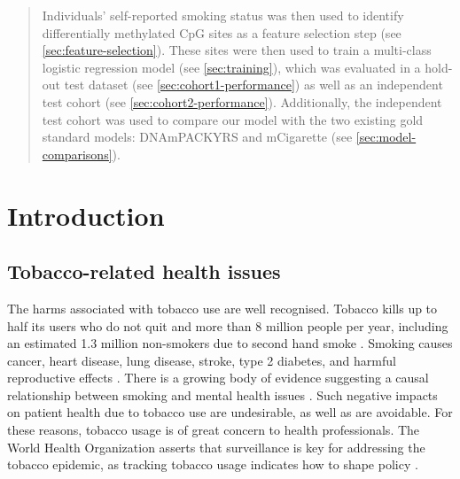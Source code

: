 \documentclass[draft]{article}
\begin{document}

\begin{abstract}
    Individuals' self-reported smoking status was then used to identify differentially methylated CpG sites as a feature selection step (see \ref{sec:feature-selection}). These sites were then used to train a multi-class logistic regression model (see \ref{sec:training}), which was evaluated in a hold-out test dataset (see \ref{sec:cohort1-performance}) as well as an independent test cohort (see \ref{sec:cohort2-performance}). Additionally, the independent test cohort was used to compare our model with the two existing gold standard models: DNAmPACKYRS and mCigarette (see \ref{sec:model-comparisons}).
\end{abstract}

\newpage
\tableofcontents

\listoffigures
\listoftables
\listofequations

\newpage
{}

\section{Introduction}
\subsection{Tobacco-related health issues}
The harms associated with tobacco use are well recognised. Tobacco kills up to half its users who do not quit and more than 8 million people per year, including an estimated 1.3 million non-smokers due to second hand smoke \cite{who_tobacco}. Smoking causes cancer, heart disease, lung disease, stroke, type 2 diabetes, and harmful reproductive effects \cite{hhs_smoking_2014}. There is a growing body of evidence suggesting a causal relationship between smoking and mental health issues \cite{taylor2019smoking}. Such negative impacts on patient health due to tobacco use are undesirable, as well as are avoidable. For these reasons, tobacco usage is of great concern to health professionals. The World Health Organization asserts that surveillance is key for addressing the tobacco epidemic, as tracking tobacco usage indicates how to shape policy \cite{who_tobacco}.
\end{document}
